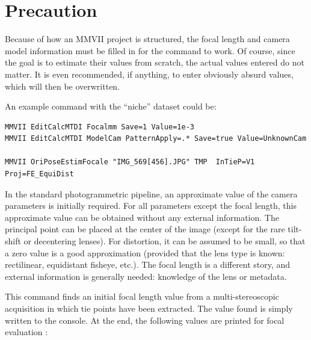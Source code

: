 \documentclass[a4paper]{article}
\begin{document}
\CmdTitle

\tableofcontents

\section{Precaution}

{\center{\textcolor{red}{\bf ============== WARNING ===========}}}

Because of how an MMVII project is structured, the focal length and camera model information must be filled 
in for the command to work. Of course, since the goal is to estimate their values from scratch, 
the actual values entered do not matter. It is even recommended, if anything, to enter obviously absurd values, 
which will then be overwritten.

An example command with the “niche” dataset could be:

{\small
\begin{verbatim}
MMVII EditCalcMTDI Focalmm Save=1 Value=1e-3
MMVII EditCalcMTDI ModelCam PatternApply=.* Save=true Value=UnknownCam

MMVII OriPoseEstimFocale "IMG_569[456].JPG" TMP  InTieP=V1 Proj=FE_EquiDist
\end{verbatim}
}




\SecDescr

In the standard photogrammetric pipeline, an approximate value of the camera parameters 
is initially required. For all parameters except the focal length, this approximate value
 can be obtained without any external information. The principal point can be placed at the 
center of the image (except for the rare tilt-shift or decentering lenses). For distortion, 
it can be assumed to be small, so that a zero value is a good approximation (provided that 
the lens type is known: rectilinear, equidistant fisheye, etc.). The focal length is a different 
story, and external information is generally needed: knowledge of the lens or metadata.


This command finds an initial focal length value from a multi-stereoscopic 
acquisition in which tie points have been extracted.
The value found is simply written to the console.  At the end, the following values
are printed for focal evaluation : 
\end{document}
